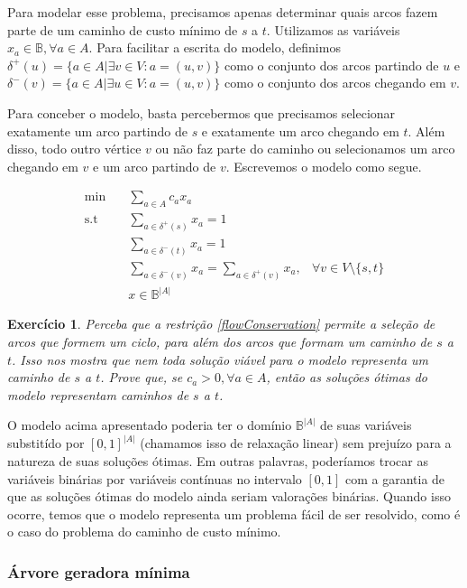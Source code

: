 \documentclass[]{article}
\newtheorem{exercicio}{Exercício}
\numberwithin{equation}{section}
\begin{document}
Para modelar esse problema, precisamos apenas determinar quais arcos fazem parte de um caminho de
custo mínimo de $s$ a $t$.
Utilizamos as variáveis $x_a \in \mathbb{B}, \forall a \in A$.
Para facilitar a escrita do modelo, definimos
$\delta^+(u) = \{a \in A | \exists v \in V : a = (u, v)\}$ como o conjunto dos arcos partindo de $u$
e $\delta^-(v) = \{a \in A | \exists u \in V : a = (u, v)\}$ como o conjunto dos arcos chegando em
$v$.

Para conceber o modelo, basta percebermos que precisamos selecionar exatamente um arco partindo de
$s$ e exatamente um arco chegando em $t$. Além disso, todo outro vértice $v$ ou não faz parte do
caminho ou selecionamos um arco chegando em $v$ e um arco partindo de $v$. Escrevemos o modelo como
segue.

\begin{align}
\min        &\quad  \sum_{a \in A} c_ax_a \\
\text{s.t}  &\quad  \sum_{a \in \delta^+(s)} x_a = 1 \\
            &\quad  \sum_{a \in \delta^-(t)} x_a = 1 \\
            &\quad  \sum_{a \in \delta^-(v)} x_a = \sum_{a \in \delta^+(v)} x_a, & \forall v \in V
            \setminus \{s, t\} \label{flowConservation} \\
            &\quad  x \in \mathbb{B}^{|A|}
\end{align}

\begin{exercicio}
  Perceba que a restrição \eqref{flowConservation} permite a seleção de arcos que formem um ciclo,
  para além dos arcos que formam um caminho de $s$ a $t$.
  Isso nos mostra que nem toda solução viável para o modelo representa um caminho de $s$ a $t$.
  Prove que, se $c_a > 0, \forall a \in A$, então as soluções ótimas do modelo representam caminhos
  de $s$ a $t$.
\end{exercicio}

O modelo acima apresentado poderia ter o domínio $\mathbb{B}^{|A|}$ de suas variáveis substitído por
$[0, 1]^{|A|}$ (chamamos isso de relaxação linear) sem prejuízo para a natureza de suas soluções
ótimas.
Em outras palavras, poderíamos trocar as variáveis binárias por variáveis contínuas no intervalo
$[0, 1]$ com a garantia de que as soluções ótimas do modelo ainda seriam valorações binárias.
Quando isso ocorre, temos que o modelo representa um problema fácil de ser resolvido, como é o caso
do problema do caminho de custo mínimo.

\subsubsection{Árvore geradora mínima}
\end{document}
